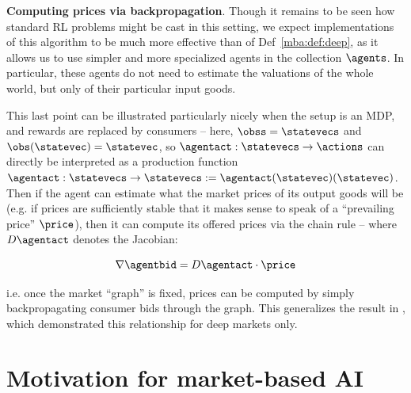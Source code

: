 \textbf{Computing prices via backpropagation}. Though it remains to be seen how standard RL problems might be cast in this setting, we expect implementations of this algorithm to be much more effective than of Def~\ref{mba:def:deep}, as it allows us to use simpler and more specialized agents in the collection $\agents$. In particular, these agents do not need to estimate the valuations of the whole world, but only of their particular input goods.

This last point can be illustrated particularly nicely when the setup is an MDP, and rewards are replaced by consumers -- here, $\obss=\statevecs$ and $\obs(\statevec)=\statevec$, so $\agentact:\statevecs\to\actions$ can directly be interpreted as a production function $\agentact:\statevecs\to\statevecs:=\agentact(\statevec)(\statevec)$. Then if the agent can estimate what the market prices of its output goods will be (e.g. if prices are sufficiently stable that it makes sense to speak of a ``prevailing price'' $\price$), then it can compute its offered prices via the chain rule -- where $D\agentact$ denotes the Jacobian:

\begin{equation}
    \nabla\agentbid=D\agentact\cdot\price
    \label{mba:eq:backprop}
\end{equation}

i.e. once the market ``graph'' is fixed, prices can be computed by simply backpropagating consumer bids through the graph. This generalizes the result in \citet{wentworthCompetitiveMarketsDistributed2018}, which demonstrated this relationship for deep markets only.



\section{Motivation for market-based AI}

